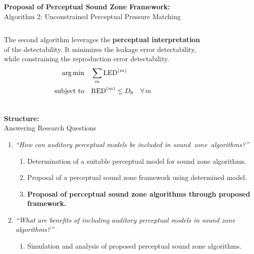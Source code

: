 \documentclass[aspectratio=169]{beamer}
\begin{document}
\begin{frame}{\textbf{Proposal of Perceptual Sound Zone Framework:}\\ Algorithm 2: Unconstrained Perceptual Pressure
    Matching}
    \begin{columns}[c]
        The second algorithm leverages the \textbf{perceptual interpretation} of the detectability.
        It minimizes the leakage error detectability, while constraining the reproduction error detectability.
        \begin{align}
            \begin{aligned}
                \operatorname*{arg\,min}_{}\quad &\sum_m \text{LED}^{(m)}\\
                \operatorname*{subject\,\,to}\quad &\text{RED}^{(m)} \leq D_0 \quad \forall\,m
            \end{aligned}
        \end{align}
        \begin{figure}[]
            \centering
            \scalebox{0.7}{}
        \end{figure}
    \end{columns}
\end{frame}

\begin{frame}{\textbf{Structure:}\\ Answering Research Questions}
    \begin{enumerate}
        \item {\textit{``How can auditory perceptual models be included in sound~zone~algorithms?''}}
            \vspace{7pt}
            \begin{enumerate}
                \item Determination of a suitable perceptual model for sound zone algorithms.
                \vspace{7pt}
                \item Proposal of a perceptual sound zone framework using determined model. 
                \vspace{7pt}
                \item \textbf{Proposal of perceptual sound zone algorithms through proposed framework.}
                \vspace{7pt}
            \end{enumerate}
        \item {\textit{``What are benefits of including auditory perceptual models in sound zone algorithms?''}}
            \vspace{-5pt}
            \begin{enumerate}
                \item Simulation and analysis of proposed perceptual sound zone algorithms.
            \end{enumerate}
    \end{enumerate}
\end{frame}
\end{document}
